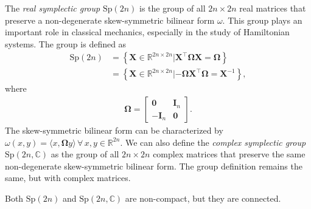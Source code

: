 \begin{example}\label{ex:symplectic-group}
    The \emph{real symplectic group} $\text{Sp}(2n)$ is the group of all $2n\times 2n$ real matrices that preserve a non-degenerate skew-symmetric bilinear form  $\omega$. This group plays an important role in classical mechanics, especially in the study of Hamiltonian systems. The group is defined as
    \begin{align}
        \text{Sp}(2n) &= \left\{\mathbf{X}\in\mathbb{R}^{2n\times 2n} | \mathbf{X}^\top\boldsymbol{\Omega}\mathbf{X} = \boldsymbol{\Omega}\right\}\\
        &= \left\{\mathbf{X}\in\mathbb{R}^{2n\times 2n} | -\boldsymbol{\Omega}\mathbf{X}^\top\boldsymbol{\Omega} = \mathbf{X}^{-1}\right\},
    \end{align}
    where 
    \begin{align}
        \boldsymbol{\Omega} = \begin{bmatrix}
            \mathbf{0} & \mathbf{I}_n\\
            -\mathbf{I}_n & \mathbf{0}
        \end{bmatrix}.
    \end{align}
    The skew-symmetric bilinear form can be characterized by $\omega(x,y)=\langle x, \boldsymbol{\Omega}y\rangle\,\forall\,x,y\in\mathbb{R}^{2n}$. We can also define the \emph{complex symplectic group} $\text{Sp}(2n, \mathbb{C})$ as the group of all $2n\times 2n$ complex matrices that preserve the same non-degenerate skew-symmetric bilinear form. The group definition remains the same, but with complex matrices.

    Both $\text{Sp}(2n)$ and $\text{Sp}(2n, \mathbb{C})$ are non-compact, but they are connected.
\end{example}
